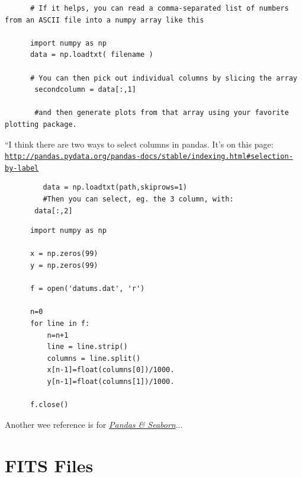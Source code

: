 \documentclass[11pt,a4paper]{article}
\begin{document}
    \begin{lstlisting}
      # If it helps, you can read a comma-separated list of numbers from an ASCII file into a numpy array like this

      import numpy as np
      data = np.loadtxt( filename )
      
      # You can then pick out individual columns by slicing the array
       secondcolumn = data[:,1]
       
       #and then generate plots from that array using your favorite plotting package.
      \end{lstlisting}
      \medskip     \medskip     \medskip

      ``I think there are two ways to select columns in pandas. 
       It’s on this page: 
       \href{http://pandas.pydata.org/pandas-docs/stable/indexing.html\#selection-by-label}{\tt http://pandas.pydata.org/pandas-docs/stable/indexing.html\#selection-by-label}        \\
       \begin{lstlisting}
         data = np.loadtxt(path,skiprows=1)
         #Then you can select, eg. the 3 column, with:
       data[:,2]
      \end{lstlisting}
    \medskip     \medskip     \medskip


    \begin{lstlisting}
      import numpy as np

      x = np.zeros(99)
      y = np.zeros(99)
      
      f = open('datums.dat', 'r')
      
      n=0
      for line in f:
          n=n+1
          line = line.strip()
          columns = line.split()
          x[n-1]=float(columns[0])/1000.
          y[n-1]=float(columns[1])/1000.
          
      f.close()
    \end{lstlisting}

    Another wee reference is for 
    \href{https://tryolabs.com/blog/2017/03/16/pandas-seaborn-a-guide-to-handle-visualize-data-elegantly/}{{\it Pandas \& Seaborn}}...



\newpage
\section{FITS Files}\label{sec:FITS}
\end{document}
